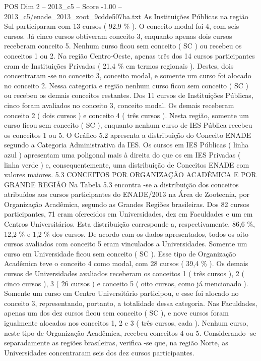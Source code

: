 \begin{textsample}{POS Dim 2 – 2013\_c5 – Score -1.00 – 2013\_c5/enade\_2013\_zoot\_9cdde507ba.txt}
As Instituições Públicas na região Sul participaram com 13 cursos ( 92,9 \% ).
O conceito modal foi 4, com seis cursos.
Já cinco cursos obtiveram conceito 3, enquanto apenas dois cursos receberam conceito 5.
Nenhum curso ficou sem conceito ( SC ) ou recebeu os conceitos 1 ou 2.
Na região Centro-Oeste, apenas três dos 14 cursos participantes eram de Instituições Privadas ( 21,4 \% em termos regionais ).
Destes, dois concentraram -se no conceito 3, conceito modal, e somente um curso foi alocado no conceito 2.
Nessa categoria e região nenhum curso ficou sem conceito ( SC ) ou recebeu os demais conceitos restantes.
Dos 11 cursos de Instituições Públicas, cinco foram avaliados no conceito 3, conceito modal.
Os demais receberam conceito 2 ( dois cursos ) e conceito 4 ( três cursos ).
Nesta região, somente um curso ficou sem conceito ( SC ), enquanto nenhum curso de IES Pública recebeu os conceitos 1 ou 5.
O Gráfico 5.2 apresenta a distribuição do Conceito ENADE segundo a Categoria Administrativa da IES.
Os cursos em IES Públicas ( linha azul ) apresentam uma poligonal mais à direita do que os em IES Privadas ( linha verde ) e, consequentemente, uma distribuição de Conceitos ENADE com valores maiores. 5.3 CONCEITOS POR ORGANIZAÇÃO ACADÊMICA E POR GRANDE REGIÃO Na Tabela 5.3 encontra -se a distribuição dos conceitos atribuídos aos cursos participantes do ENADE/2013 na Área de Zootecnia, por Organização Acadêmica, segundo as Grandes Regiões brasileiras.
Dos 82 cursos participantes, 71 eram oferecidos em Universidades, dez em Faculdades e um em Centros Universitários.
Esta distribuição corresponde a, respectivamente, 86,6 \%, 12,2 \% e 1,2 \% dos cursos.
De acordo com os dados apresentados, todos os oito cursos avaliados com conceito 5 eram vinculados a Universidades.
Somente um curso em Universidade ficou sem conceito ( SC ).
Esse tipo de Organização Acadêmica teve o conceito 4 como modal, com 28 cursos ( 39,4 \% ).
Os demais cursos de Universidades avaliados receberam os conceitos 1 ( três cursos ), 2 ( cinco cursos ), 3 ( 26 cursos ) e conceito 5 ( oito cursos, como já mencionado ).
Somente um curso em Centro Universitário participou, e esse foi alocado no conceito 3, representando, portanto, a totalidade dessa categoria.
Nas Faculdades, apenas um dos dez cursos ficou sem conceito ( SC ), e nove cursos foram igualmente alocados nos conceitos 1, 2 e 3 ( três cursos, cada ).
Nenhum curso, neste tipo de Organização Acadêmica, recebeu conceitos 4 ou 5.
Considerando -se separadamente as regiões brasileiras, verifica -se que, na região Norte, as Universidades concentraram seis dos dez cursos participantes.

\end{textsample}
